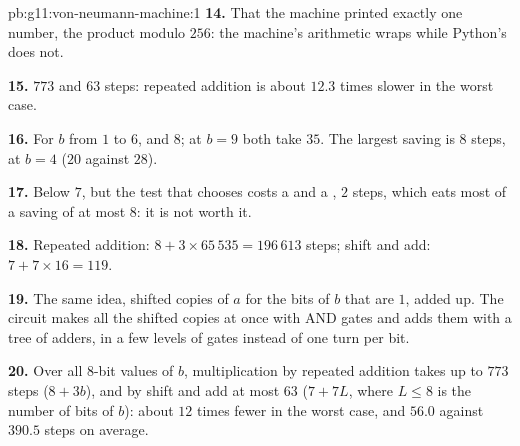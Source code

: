 \begin{solution}{pb:g11:von-neumann-machine:1}
\textbf{14.} That the machine printed exactly one number, the product modulo $256$: the machine's arithmetic wraps
while Python's does not.

\textbf{15.} $773$ and $63$ steps: repeated addition is about $12.3$ times slower in the worst case.

\textbf{16.} For $b$ from $1$ to $6$, and $8$; at $b = 9$ both take $35$. The largest saving is $8$ steps, at $b = 4$
($20$ against $28$).

\textbf{17.} Below $7$, but the test that chooses costs a  and a , $2$ steps, which eats most of a saving
of at most $8$: it is not worth it.

\textbf{18.} Repeated addition: $8 + 3 \times 65\,535 = 196\,613$ steps; shift and add: $7 + 7 \times 16 = 119$.

\textbf{19.} The same idea, shifted copies of $a$ for the bits of $b$ that are $1$, added up. The circuit makes all the
shifted copies at once with AND gates and adds them with a tree of adders, in a few levels of gates instead of one
turn per bit.

\textbf{20.} Over all $8$-bit values of $b$, multiplication by repeated addition takes up to $773$ steps ($8 + 3b$),
and by shift and add at most $63$ ($7 + 7L$, where $L \le 8$ is the number of bits of $b$): about $12$ times fewer in
the worst case, and $56.0$ against $390.5$ steps on average.
\end{solution}
